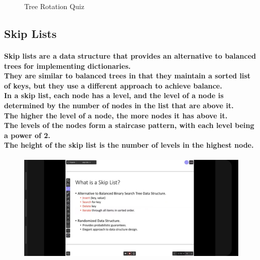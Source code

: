 \documentclass{article}
\begin{document}
\begin{figure}[H]
{    }
    \caption{Tree Rotation Quiz}
\end{figure}


\subsection{Skip Lists}

\paragraph{
    Skip lists are a data structure that provides an alternative to balanced trees for implementing dictionaries.\\
    They are similar to balanced trees in that they maintain a sorted list of keys, but they use a different approach to achieve balance.\\
    In a skip list, each node has a level, and the level of a node is determined by the number of nodes in the list that are above it.\\
    The higher the level of a node, the more nodes it has above it.\\
    The levels of the nodes form a staircase pattern, with each level being a power of 2.\\
    The height of the skip list is the number of levels in the highest node.\\
}


\begin{figure}[H]
    \includegraphics[width=\textwidth]{whatisaskiplist.jpg}
\end{figure}
\end{document}
